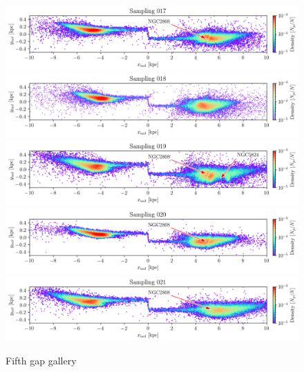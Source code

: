 \documentclass[draft]{aa}
\begin{document}
\begin{appendix}
    \begin{figure}
      \centering
      \includegraphics[width=\linewidth]{gallery_of_gaps_monte-carlo-017.png}
      \includegraphics[width=\linewidth]{gallery_of_gaps_monte-carlo-018.png}
      \includegraphics[width=\linewidth]{gallery_of_gaps_monte-carlo-019.png}      
      \includegraphics[width=\linewidth]{gallery_of_gaps_monte-carlo-020.png}
      \includegraphics[width=\linewidth]{gallery_of_gaps_monte-carlo-021.png}
      \caption{Fifth gap gallery}
      \label{fig:gallery4}
      \end{figure}        


\end{appendix}
\end{document}
